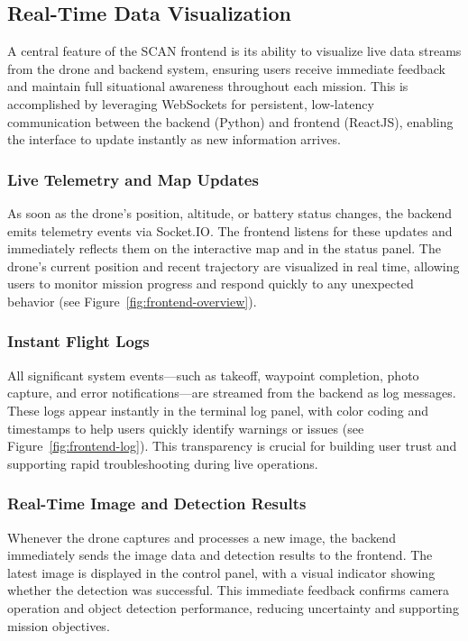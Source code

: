 \subsection{Real-Time Data Visualization}
\label{sec:realtime-visualization}

A central feature of the SCAN frontend is its ability to visualize live data streams from the drone and backend system, ensuring users receive immediate feedback and maintain full situational awareness throughout each mission. 
This is accomplished by leveraging WebSockets for persistent, low-latency communication between the backend (Python) and frontend (ReactJS), enabling the interface to update instantly as new information arrives.

\subsubsection{Live Telemetry and Map Updates}
As soon as the drone’s position, altitude, or battery status changes, the backend emits telemetry events via Socket.IO. 
The frontend listens for these updates and immediately reflects them on the interactive map and in the status panel. 
The drone’s current position and recent trajectory are visualized in real time, allowing users to monitor mission progress and respond quickly to any unexpected behavior (see Figure~\ref{fig:frontend-overview}).

\subsubsection{Instant Flight Logs}
All significant system events---such as takeoff, waypoint completion, photo capture, and error notifications---are streamed from the backend as log messages. 
These logs appear instantly in the terminal log panel, with color coding and timestamps to help users quickly identify warnings or issues (see Figure~\ref{fig:frontend-log}). 
This transparency is crucial for building user trust and supporting rapid troubleshooting during live operations.

\subsubsection{Real-Time Image and Detection Results}
Whenever the drone captures and processes a new image, the backend immediately sends the image data and detection results to the frontend. 
The latest image is displayed in the control panel, with a visual indicator showing whether the detection was successful. 
This immediate feedback confirms camera operation and object detection performance, reducing uncertainty and supporting mission objectives.

